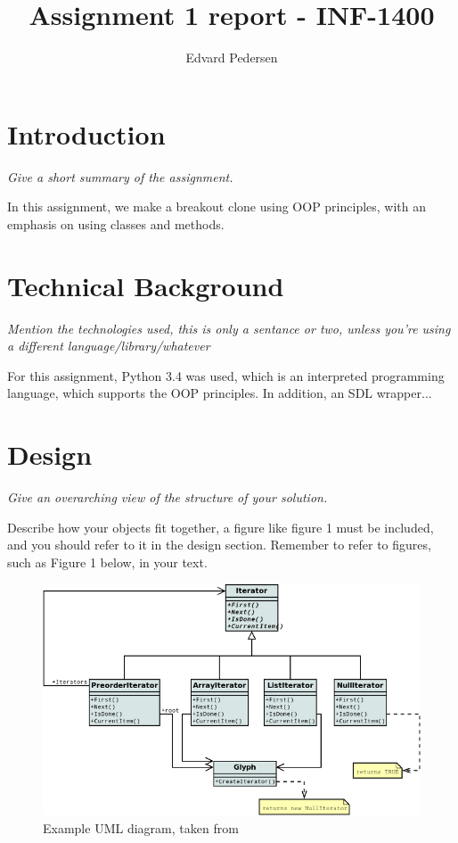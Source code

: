 \documentclass[11pt]{article}
\title{Assignment 1 report - INF-1400}
\author{Edvard Pedersen}
\begin{document}
\maketitle

\section{Introduction}

\emph{Give a short summary of the assignment.}

In this assignment, we make a breakout clone using OOP principles, with an emphasis on using classes and methods. 

\section{Technical Background}

\emph{Mention the technologies used, this is only a sentance or two, unless you're using a different language/library/whatever}

For this assignment, Python 3.4\cite{python} was used, which is an interpreted programming language, which supports the OOP principles. In addition, an SDL wrapper...

\section{Design}

\emph{Give an overarching view of the structure of your solution.}

Describe how your objects fit together, a figure like figure 1 must be included, and you should refer to it in the design section. Remember to refer to figures, such as Figure 1 below, in your text.

\begin{figure}[h]
	\centering
	\includegraphics[width=\textwidth]{UML.png}
	\caption{Example UML diagram, taken from \cite{umlsource}}
	\label{umlfig}
\end{figure}
\end{document}
